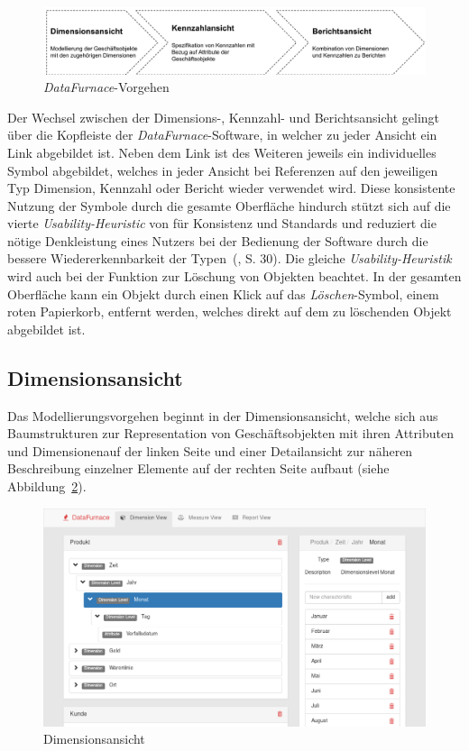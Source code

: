\documentclass[
  language=german, %
  type=bachelor,%
  ngerman
]{isthesis}
\begin{document}
\begin{content}
  \begin{figure}
    \includegraphics[scale=0.60]{content/figures/datafurnace-process}
    \caption{\textit{DataFurnace}-Vorgehen}\label{datafurnace-prozess}
  \end{figure}

  Der Wechsel zwischen der Dimensions-, Kennzahl- und Berichtsansicht gelingt
  über die Kopfleiste der \textit{DataFurnace}-Software, in welcher zu jeder
  Ansicht ein Link abgebildet ist. Neben dem Link ist des Weiteren jeweils ein
  individuelles Symbol abgebildet, welches in jeder Ansicht bei Referenzen auf
  den jeweiligen Typ Dimension, Kennzahl oder Bericht wieder verwendet wird.
  Diese konsistente Nutzung der Symbole durch die gesamte Oberfläche hindurch
  stützt sich auf die vierte \textit{Usability-Heuristic} von
  \textsc{\citeauthor{nielsen1994heuristic}} für Konsistenz und Standards und
  reduziert die nötige Denkleistung eines Nutzers bei der Bedienung der
  Software durch die bessere Wiedererkennbarkeit der
  Typen~(\citeyear{nielsen1994heuristic}, S. 30).  Die gleiche
  \textit{Usability-Heuristik} wird auch bei der Funktion zur Löschung von
  Objekten beachtet. In der gesamten Oberfläche kann ein Objekt durch einen
  Klick auf das \textit{Löschen}-Symbol, einem roten Papierkorb, entfernt
  werden, welches direkt auf dem zu löschenden Objekt abgebildet ist.


  \subsection{Dimensionsansicht}\label{subsec:dimensionsansicht}

  Das Modellierungsvorgehen beginnt in der Dimensionsansicht, welche sich aus
  Baumstrukturen zur Representation von Geschäftsobjekten mit ihren Attributen
  und Dimensionenauf der linken Seite und einer Detailansicht zur näheren
  Beschreibung einzelner Elemente auf der rechten Seite aufbaut (siehe
  Abbildung~\ref{dimensionsansicht}). 

  \begin{figure}
    \includegraphics[scale=0.4]{content/figures/dimension-view.png}
    \caption{Dimensionsansicht}\label{dimensionsansicht}
  \end{figure}


\end{content}
\end{document}
